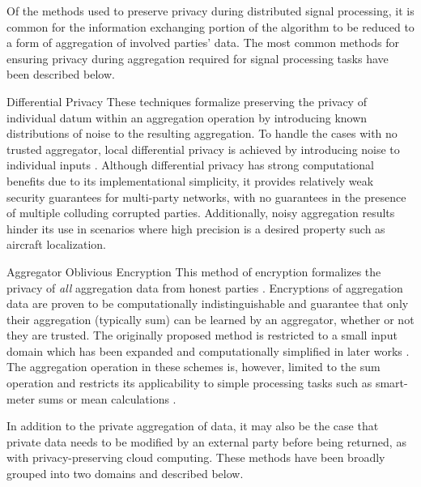 \documentclass[10pt,letterpaper,oneside,twocolumn,journal]{IEEEtran}
\theoremstyle{definition}
\theoremstyle{definition}
\theoremstyle{remark}
\begin{document}
Of the methods used to preserve privacy during distributed signal processing, it is common for the information exchanging portion of the algorithm to be reduced to a form of aggregation of involved parties' data. The most common methods for ensuring privacy during aggregation required for signal processing tasks have been described below.
\begin{LaTeXdescription}
    \item[Differential Privacy] These techniques formalize preserving the privacy of individual datum within an aggregation operation by introducing known distributions of noise to the resulting aggregation. To handle the cases with no trusted aggregator, local differential privacy is achieved by introducing noise to individual inputs \cite{hanPrivacyControlDynamical2018,dworkDifferentialPrivacySurvey2008,andresGeoindistinguishabilityDifferentialPrivacy2013}. Although differential privacy has strong computational benefits due to its implementational simplicity, it provides relatively weak security guarantees for multi-party networks, with no guarantees in the presence of multiple colluding corrupted parties. Additionally, noisy aggregation results hinder its use in scenarios where high precision is a desired property such as aircraft localization.
    \item[Aggregator Oblivious Encryption] This method of encryption formalizes the privacy of \textit{all} aggregation data from honest parties \cite{shiPrivacyPreservingAggregationTimeSeries2011,chanPrivacyPreservingStreamAggregation2012,joyeScalableSchemePrivacyPreserving2013}. Encryptions of aggregation data are proven to be computationally indistinguishable and guarantee that only their aggregation (typically sum) can be learned by an aggregator, whether or not they are trusted. The originally proposed method \cite{shiPrivacyPreservingAggregationTimeSeries2011} is restricted to a small input domain which has been expanded and computationally simplified in later works \cite{joyeScalableSchemePrivacyPreserving2013,benhamoudaNewFrameworkPrivacyPreserving2016}. The aggregation operation in these schemes is, however, limited to the sum operation and restricts its applicability to simple processing tasks such as smart-meter sums or mean calculations \cite{chanPrivacyPreservingStreamAggregation2012,benhamoudaNewFrameworkPrivacyPreserving2016}.
\end{LaTeXdescription}
In addition to the private aggregation of data, it may also be the case that private data needs to be modified by an external party before being returned, as with privacy-preserving cloud computing. These methods have been broadly grouped into two domains and described below.
\end{document}
